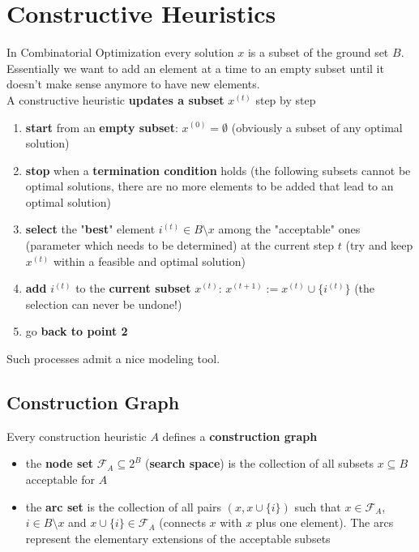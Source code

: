 \section{Constructive Heuristics}
In Combinatorial Optimization every solution $x$ is a subset of the ground set $B$.\\

Essentially we want to add an element at a time to an empty subset until it doesn't make sense anymore to have new elements.\\

A constructive heuristic \textbf{updates a subset} $x^{(t)}$ step by step
\begin{enumerate}
	\item \textbf{start} from an \textbf{empty subset}: $x^{(0)} = \emptyset$ (obviously a subset of any optimal solution)
	\item \textbf{stop} when a \textbf{termination condition} holds (the following subsets cannot be optimal solutions, there are no more elements to be added that lead to an optimal solution)
	\item \textbf{select} the "\textbf{best}" element $i^{(t)} \in B \setminus x$ among the "acceptable" ones (parameter which needs to be determined) at the current step $t$ (try and keep $x^{(t)}$ within a feasible and optimal solution)
	\item \textbf{add} $i^{(t)}$ to the \textbf{current subset} $x^{(t)}: \, x^{(t+1)} := x^{(t)} \cup \{i^{(t)}\}$ (the selection can never be undone!)
	\item go \textbf{back to point 2}
\end{enumerate}
Such processes admit a nice modeling tool.\\

\newpage

\subsection{Construction Graph}
Every construction heuristic $A$ defines a \textbf{construction graph}
\begin{itemize}
	\item the \textbf{node set} $\mathcal{F}_A \subseteq 2^B$ (\textbf{search space}) is the collection of all subsets $x \subseteq B$ acceptable for $A$
	\item the \textbf{arc set} is the collection of all pairs $(x, x \cup \{i\})$ such that $x \in \mathcal{F}_A$, $i \in B \setminus x$ and $x \cup \{i\} \in \mathcal{F}_A$ (connects $x$ with $x$ plus one element). The arcs represent the elementary extensions of the acceptable subsets
\end{itemize}

